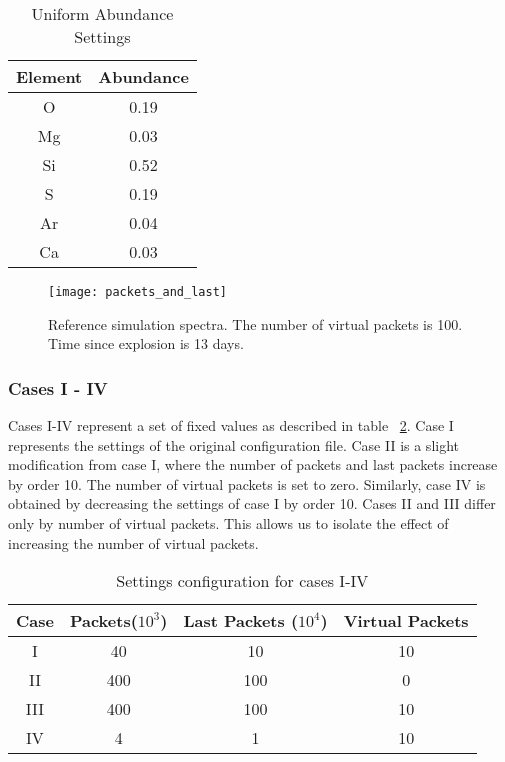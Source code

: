 \documentclass[letterpaper,12pt]{article}
\begin{document}
\begin{table}[ht] 
  \centering %
  \begin{tabular}{c c} %
    \hline\hline %
    Element & Abundance \\ [0.5ex] %
    \hline %
    O & 0.19 \\ %
    Mg & 0.03 \\ 
    Si & 0.52 \\ 
    S & 0.19 \\ 
    Ar & 0.04 \\ 
    Ca & 0.03 \\ [1ex]
    \hline %
  \end{tabular}
  \caption{Uniform Abundance Settings} %
  \label{table:abundance} %
\end{table} 

\begin{figure}[htpb]
  \centering
  \texttt{[image: packets\_and\_last]}
  \caption{  
    \label{fig:best_fit}
    Reference simulation spectra. The number of virtual packets is 100. Time since explosion is 13 days.
}
\end{figure}

\subsubsection{\label{sec:cases} Cases I - IV}

Cases I-IV represent a set of fixed values as described in table ~\ref{table:cases}. Case I represents the settings of the original configuration file. Case II is a slight modification from case I, where the number of packets and last packets increase by order 10. The number of virtual packets is set to zero. Similarly, case IV is obtained by decreasing the settings of case I by order 10. Cases II and III differ only by number of virtual packets. This allows us to isolate the effect of increasing the number of virtual packets.
  
\begin{table}[ht] 
\centering %
\begin{tabular}{c c c c} %
\hline\hline %
Case & Packets($10^3$) & Last Packets ($10^4$) & Virtual Packets\\ [0.5ex] %
\hline %
I   & 40 & 10 & 10 \\ %
II  & 400 & 100 & 0 \\ 
III & 400 & 100 & 10 \\ 
IV  & 4 & 1 & 10 \\ 
\hline %
\end{tabular} 
\caption{Settings configuration for cases I-IV} %
\label{table:cases} %
\end{table} 
\end{document}
